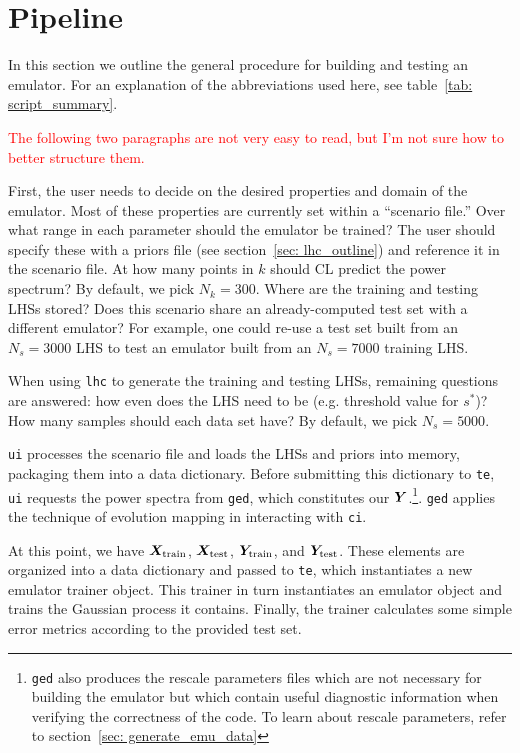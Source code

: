 \section{Pipeline}
\label{sec: flow_chart}


In this section we outline the general procedure for building and testing an
emulator. For an explanation of the abbreviations used here, see table~\ref{tab: script_summary}. 

\textcolor{red}{The following two paragraphs are not very easy to read, but 
I'm not sure how to better structure them.}

First, the user needs to decide on the desired properties and domain of the
emulator. Most of these properties are currently set within a ``scenario
file.'' Over what range in each parameter should the emulator be trained?
The user should specify these with a priors file (see section~\ref{sec: 
lhc_outline}) and reference it in the scenario file. At how many points in
$k$ should CL predict the power spectrum? By default, we pick $N_k = 300$. 
Where are the training and testing LHSs stored? Does this scenario share an
already-computed test set with a different emulator? For example, one could
re-use a test set built from an $N_s=3000$ LHS to test an emulator built from
an $N_s=7000$ training LHS.

When using \texttt{lhc} to generate the training and testing
LHSs, remaining questions are answered: how even does the LHS need to be
(e.g. threshold value for $s^*$)? How many samples should each data set have?
By default, we pick $N_s = 5000$.

\texttt{ui} processes the scenario file and loads the LHSs and priors into
memory, packaging them into a data dictionary. Before submitting this
dictionary to \texttt{te}, \texttt{ui} requests the power spectra from
\texttt{ged}, which constitutes our $\bm{Y}$.\footnote{\texttt{ged} also 
produces the rescale parameters files which are not
necessary for building the emulator but which contain useful diagnostic
information when verifying the correctness of the code. To learn about rescale
parameters, refer to section~\ref{sec: generate_emu_data}}. \texttt{ged}
applies the technique of evolution mapping in interacting with \texttt{ci}. 

At this point, we have $\bm{X}_\text{train}$, $\bm{X}_\text{test}$, 
$\bm{Y}_\text{train}$, and $\bm{Y}_\text{test}$. These elements are
organized into a data dictionary and passed to \texttt{te}, which instantiates
a new emulator trainer object. This trainer in turn instantiates an emulator 
object and trains the Gaussian process it contains. Finally, the trainer 
calculates some simple error metrics according to the provided test set.

